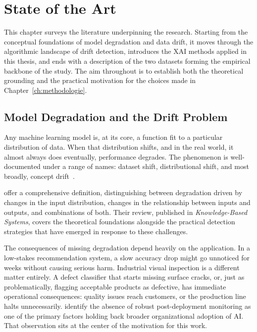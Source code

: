 
\chapter{State of the Art}%
\label{ch:stand-van-zaken}

This chapter surveys the literature underpinning the research. Starting from the conceptual foundations of model degradation and data drift, it moves through the algorithmic landscape of drift detection, introduces the XAI methods applied in this thesis, and ends with a description of the two datasets forming the empirical backbone of the study. The aim throughout is to establish both the theoretical grounding and the practical motivation for the choices made in Chapter~\ref{ch:methodologie}.

\section{Model Degradation and the Drift Problem}
\label{sec:modeldegradation}

Any machine learning model is, at its core, a function fit to a particular distribution of data. When that distribution shifts, and in the real world, it almost always does eventually, performance degrades. The phenomenon is well-documented under a range of names: dataset shift, distributional shift, and most broadly, concept drift~\autocite{Bayram2022}.

\textcite{Bayram2022} offer a comprehensive definition, distinguishing between degradation driven by changes in the input distribution, changes in the relationship between inputs and outputs, and combinations of both. Their review, published in \textit{Knowledge-Based Systems}, covers the theoretical foundations alongside the practical detection strategies that have emerged in response to these challenges.

The consequences of missing degradation depend heavily on the application. In a low-stakes recommendation system, a slow accuracy drop might go unnoticed for weeks without causing serious harm. Industrial visual inspection is a different matter entirely. A defect classifier that starts missing surface cracks, or, just as problematically, flagging acceptable products as defective, has immediate operational consequences: quality issues reach customers, or the production line halts unnecessarily. \textcite{Radhakrishnan2020} identify the absence of robust post-deployment monitoring as one of the primary factors holding back broader organizational adoption of AI. That observation sits at the center of the motivation for this work.

